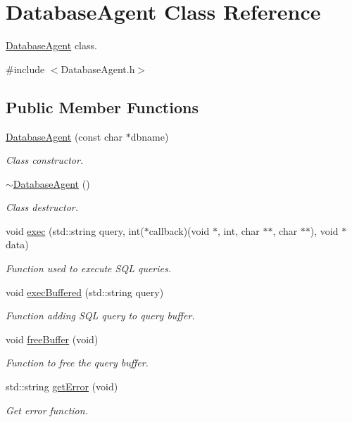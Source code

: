 \hypertarget{class_database_agent}{}\section{Database\+Agent Class Reference}
\label{class_database_agent}


\hyperlink{class_database_agent}{Database\+Agent} class.  




{\ttfamily \#include $<$Database\+Agent.\+h$>$}

\subsection*{Public Member Functions}
\begin{DoxyCompactItemize}
\item 
\hyperlink{class_database_agent_af00e78928fe3bd97115d1123ed08d91c}{Database\+Agent} (const char $\ast$dbname)
\begin{DoxyCompactList}\small\item\em Class constructor. \end{DoxyCompactList}\item 
\hyperlink{class_database_agent_a6e201bdcbb3fd95df24d244bf101143e}{$\sim$\+Database\+Agent} ()\hypertarget{class_database_agent_a6e201bdcbb3fd95df24d244bf101143e}{}\label{class_database_agent_a6e201bdcbb3fd95df24d244bf101143e}

\begin{DoxyCompactList}\small\item\em Class destructor. \end{DoxyCompactList}\item 
void \hyperlink{class_database_agent_a21af2767f8078302a28c0e01f317e042}{exec} (std\+::string query, int($\ast$callback)(void $\ast$, int, char $\ast$$\ast$, char $\ast$$\ast$), void $\ast$data)
\begin{DoxyCompactList}\small\item\em Function used to execute S\+QL queries. \end{DoxyCompactList}\item 
void \hyperlink{class_database_agent_a947629f03edce06965a18e3a3726ade1}{exec\+Buffered} (std\+::string query)
\begin{DoxyCompactList}\small\item\em Function adding S\+QL query to query buffer. \end{DoxyCompactList}\item 
void \hyperlink{class_database_agent_a0df6a03010d2bbf11852577de324aa67}{free\+Buffer} (void)
\begin{DoxyCompactList}\small\item\em Function to free the query buffer. \end{DoxyCompactList}\item 
std\+::string \hyperlink{class_database_agent_a8305f1e19cb08ff19ce88a9ec3735162}{get\+Error} (void)
\begin{DoxyCompactList}\small\item\em Get error function. \end{DoxyCompactList}\end{DoxyCompactItemize}


